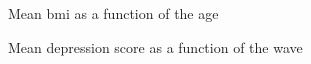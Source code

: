 \begin{figure}[H]
\caption{Mean bmi as a function of the age}
\label{fig:agebmi}
\end{figure}

\begin{figure}[H]
\caption{Mean depression score as a function of the wave}
\label{fig:wavecesd}
\end{figure}

